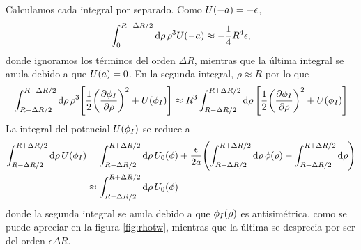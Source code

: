 Calculamos cada integral por separado. Como $U\qty(-a) = -\epsilon$, %
\begin{equation}
 \int_0^{R - \Delta R/2} \dd{\rho}  \rho^3 U\qty(-a) 
\approx -\frac{1}{4} R^4 \epsilon, %
\end{equation}
donde ignoramos los términos del orden $\Delta R$, mientras que la última integral se anula debido a que $ U\qty(a) = 0$. En la segunda integral, $\rho \approx R$ por lo que
\begin{equation}
\int_{R - \Delta R/2}^{R+\Delta R/2} \dd{\rho}  \rho^3 \qty[\frac{1}{2}\qty(\pdv{\phi_I}{\rho})^2 + U\qty(\phi_I)] \approx R^3 \int_{R - \Delta R/2}^{R+\Delta R/2} \dd{\rho} \qty[\frac{1}{2}\qty(\pdv{\phi_I}{\rho})^2 + U\qty(\phi_I)] 
\end{equation}
La integral del potencial $U\qty(\phi_I)$ se reduce a  %
\begin{align}
\int_{R - \Delta R/2}^{R+\Delta R/2} \dd{\rho}  U\qty(\phi_I) &= \int_{R - \Delta R/2}^{R+\Delta R/2} \dd{\rho} U_0\qty(\phi) + \frac{\epsilon}{2a}\qty(\int_{R - \Delta R/2}^{R+\Delta R/2} \dd{\rho}\phi\qty(\rho) - \int_{R - \Delta R/2}^{R+\Delta R/2} \dd{\rho}) \\ 
&\approx \int_{R - \Delta R/2}^{R+\Delta R/2} \dd{\rho} U_0\qty(\phi)
\end{align}
donde la segunda integral se anula debido a que $\phi_I\qty(\rho)$ es antisimétrica, como se puede apreciar en la figura \ref{fig:rhotw}, mientras que la última se desprecia por ser del orden $\epsilon\Delta R$.

